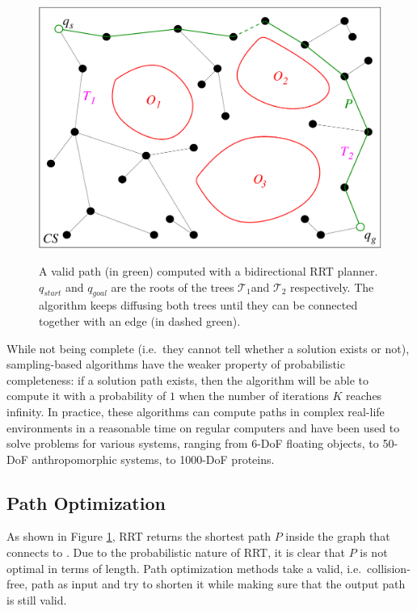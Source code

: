 \begin{figure}
  \centering
      {\includegraphics[width = 0.8\linewidth]
        {src/chap1-path-optimization/rrt.pdf}}
      \caption{A valid path (in green) computed with a bidirectional
        RRT planner. $q_{start}$ and $q_{goal}$ are the roots of the
        trees $\mathcal{T}_{1}$and $\mathcal{T}_{2}$ respectively. The
        algorithm keeps diffusing both trees until they can be
        connected together with an edge (in dashed green).}
      \label{fig:chap1-rrt}
\end{figure}

While not being complete (i.e.\ they cannot tell whether a solution
exists or not), sampling-based algorithms have the weaker property of
probabilistic completeness: if a solution path exists, then the
algorithm will be able to compute it with a probability of $1$ when
the number of iterations $K$ reaches infinity. In practice, these
algorithms can compute paths in complex real-life environments in a
reasonable time on regular computers and have been used to solve
problems for various systems, ranging from 6-DoF floating objects, to
50-DoF anthropomorphic systems, to 1000-DoF proteins.

\subsection{Path Optimization}
\label{subsec:chap1-path-optimization}

As shown in Figure \ref{fig:chap1-rrt}, RRT returns the shortest path
$P$ inside the graph that connects  to . Due to
the probabilistic nature of RRT, it is clear that $P$ is not optimal
in terms of length. Path optimization methods take a valid,
i.e.\ collision-free, path as input and try to shorten it while making
sure that the output path is still valid.

